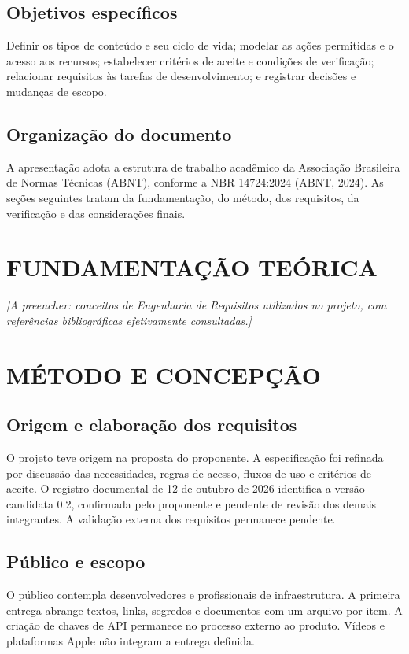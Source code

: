 \documentclass[12pt,oneside,openany,a4paper,english,brazil]{abntex2}
\newcommand{\pendente}[1]{\textit{[A preencher: #1.]}}
\begin{document}
\section{Objetivos específicos}
Definir os tipos de conteúdo e seu ciclo de vida; modelar as ações permitidas
e o acesso aos recursos; estabelecer critérios de aceite e condições de
verificação; relacionar requisitos às tarefas de desenvolvimento; e registrar
decisões e mudanças de escopo.

\section{Organização do documento}
A apresentação adota a estrutura de trabalho acadêmico da Associação
Brasileira de Normas Técnicas (ABNT), conforme a NBR 14724:2024
(ABNT, 2024). As seções seguintes tratam da fundamentação, do método,
dos requisitos, da verificação e das considerações finais.

\chapter{FUNDAMENTAÇÃO TEÓRICA}
\pendente{conceitos de Engenharia de Requisitos utilizados no projeto,
com referências bibliográficas efetivamente consultadas}

\chapter{MÉTODO E CONCEPÇÃO}
\section{Origem e elaboração dos requisitos}
O projeto teve origem na proposta do proponente. A especificação foi refinada
por discussão das necessidades, regras de acesso, fluxos de uso e critérios de
aceite. O registro documental de 12 de outubro de 2026 identifica a versão
candidata 0.2, confirmada pelo proponente e pendente de revisão dos demais
integrantes. A validação externa dos requisitos permanece pendente.

\section{Público e escopo}
O público contempla desenvolvedores e profissionais de infraestrutura.
A primeira entrega abrange textos, links, segredos e documentos com um
arquivo por item. A criação de chaves de API permanece no processo externo
ao produto. Vídeos e plataformas Apple não integram a entrega definida.
\end{document}
